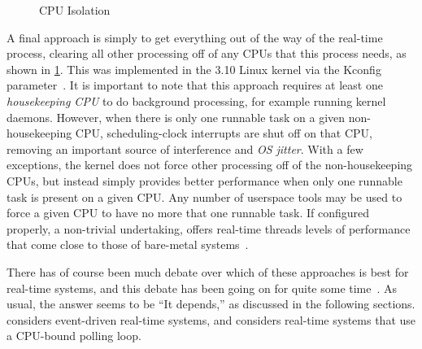 \begin{figure}[tb]
\centering
{}
\caption{CPU Isolation}
\label{fig:advsync:CPU Isolation}
\end{figure}

A final approach is simply to get everything out of the way of the
real-time process, clearing all other processing off of any CPUs that
this process needs, as shown in \cref{fig:advsync:CPU Isolation}.
This was implemented in the 3.10 Linux kernel via the 
Kconfig parameter~\cite{JonCorbet2013NO-HZ-FULL,FredericWeisbecker2013nohz}.
It is important to note that this approach requires at least one
\emph{housekeeping CPU} to do background processing, for example running
kernel daemons.
However, when there is only one runnable task on a given non-housekeeping CPU,
scheduling-clock interrupts are shut off on that CPU, removing an important
source of interference and \emph{OS jitter}.
With a few exceptions, the kernel does not force other processing off of the
non-housekeeping CPUs, but instead simply provides better performance
when only one runnable task is present on a given CPU\@.
Any number of userspace tools may be used to force a given CPU to have
no more that one runnable task.
If configured properly, a non-trivial undertaking, 
offers real-time threads levels of performance that come close to those of
bare-metal systems~\cite{AbdullahAljuhni2018nohzfull}.

There has of course been much debate over which of these approaches
is best for real-time systems, and this debate has been going on for
quite some
time~\cite{JonCorbet2004RealTimeLinuxPart1,JonCorbet2004RealTimeLinuxPart2}.
As usual, the answer seems to be ``It depends,'' as discussed in the
following sections.
considers event-driven real-time systems, and
considers real-time systems that use a CPU-bound polling loop.

